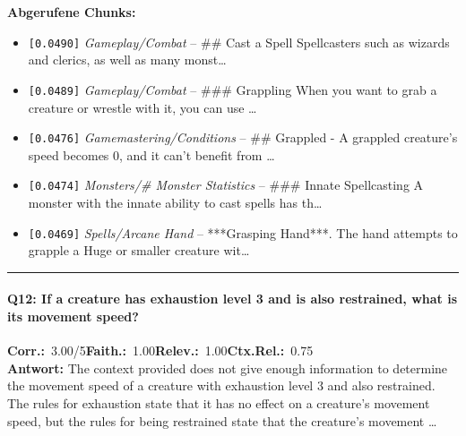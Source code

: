 \noindent\textbf{Abgerufene Chunks:}
\begin{itemize}[noitemsep, topsep=2pt]
  \item[\textbf{\#1}] \texttt{[0.0490]} \textit{Gameplay/Combat} -- \#\# Cast a Spell  Spellcasters such as wizards and clerics, as well as many monst\ldots
  \item[\textbf{\#2}] \texttt{[0.0489]} \textit{Gameplay/Combat} -- \#\#\# Grappling  When you want to grab a creature or wrestle with it, you can use \ldots
  \item[\textbf{\#3}] \texttt{[0.0476]} \textit{Gamemastering/Conditions} -- \#\# Grappled  - A grappled creature's speed becomes 0, and it can't benefit from \ldots
  \item[\textbf{\#4}] \texttt{[0.0474]} \textit{Monsters/# Monster Statistics} -- \#\#\# Innate Spellcasting  A monster with the innate ability to cast spells has th\ldots
  \item[\textbf{\#5}] \texttt{[0.0469]} \textit{Spells/Arcane Hand} -- ***Grasping Hand***. The hand attempts to grapple a Huge or smaller creature wit\ldots
\end{itemize}
\vspace{4pt}
\hrule
\vspace{6pt}

\paragraph{Q12: If a creature has exhaustion level 3 and is also restrained, what is its movement speed?}
\noindent \textbf{Corr.:}~3.00/5\quad \textbf{Faith.:}~1.00\quad \textbf{Relev.:}~1.00\quad \textbf{Ctx.Rel.:}~0.75\\

\noindent\textbf{Antwort:} The context provided does not give enough information to determine the movement speed of a creature with exhaustion level 3 and also restrained. The rules for exhaustion state that it has no effect on a creature's movement speed, but the rules for being restrained state that the creature's movement \ldots

